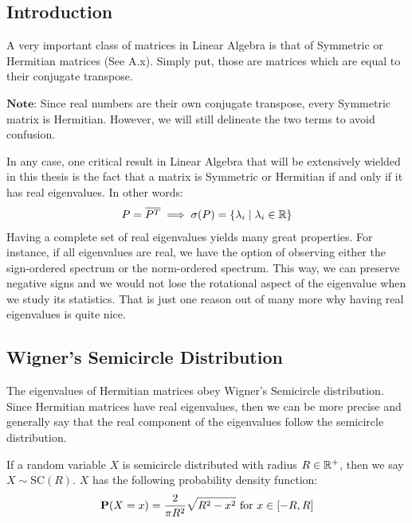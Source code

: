 \subsection{Introduction}

A very important class of matrices in Linear Algebra is that of Symmetric or Hermitian matrices (See A.x). Simply put, those are matrices which are equal to their conjugate transpose.

$\textbf{Note:}$ Since real numbers are their own conjugate transpose, every Symmetric matrix is Hermitian. However, we will still delineate the two terms to avoid confusion.

In any case, one critical result in Linear Algebra that will be extensively wielded in this thesis is the fact that a matrix is Symmetric or Hermitian if and only if it has real eigenvalues. In other words:
\begin{align*}
P = \overline{P^{T}} \implies \sigma(P) = \{\lambda_i \mid \lambda_i \in \mathbb{R}\}
\end{align*}
Having a complete set of real eigenvalues yields many great properties. For instance, if all eigenvalues are real, we have the option of observing either the sign-ordered spectrum or the norm-ordered spectrum. This way, we can preserve negative signs and we would not lose the rotational aspect of the eigenvalue when we study its statistics. That is just one reason out of many more why having real eigenvalues is quite nice.


\newpage
\subsection{Wigner's Semicircle Distribution}

The eigenvalues of Hermitian matrices obey Wigner's Semicircle distribution. Since Hermitian matrices have real eigenvalues, then we can be more precise and generally say that the real component of the eigenvalues follow the semicircle distribution.

\begin{definition}
If a random variable $X$ is semicircle distributed with radius $R \in \mathbb{R}^+$, then we say $X \sim \text{SC}(R)$. $X$ has the following probability density function:
$$\textbf{P}(X = x) = \frac{2}{\pi R^2} \sqrt{R^2 - x^2} \text{ for } x \in [-R, R]$$
\end{definition}

